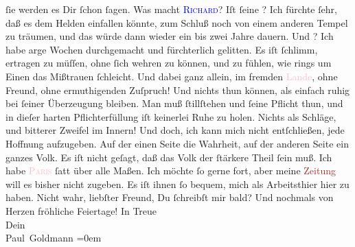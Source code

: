                ſie werden es Dir ſchon ſagen.\pend
           \pstart
           Was macht \textsc{\textcolor{blue}{Richard}{}\ledrightnote{\textcolor{blue}{Richard Beer-Hofmann}}}? Iſt ſeine \label{K_L02834-32v}\label{K_L02834-32h}? Ich fürchte ſehr, daß es dem Helden einfallen könnte,
               zum Schluß noch von einem anderen Tempel zu träumen, und das würde dann wieder ein
               bis zwei Jahre dauern. Und \label{K_L02834-8v}\label{K_L02834-8h}?{\dotsfour}\pend
           \pstart
           Ich habe arge Wochen durchgemacht und fürchterlich gelitten. Es iſt ſchlimm, \label{K_L02834-9v}\label{K_L02834-9h} ertragen zu müſſen, {\pb}ohne ſich wehren zu
               können, und zu fühlen, wie rings um Einen das Mißtrauen ſchleicht. Und dabei ganz
               allein, im fremden \textcolor{pink}{Lande}{}, ohne Freund, ohne
               ermuthigenden Zuſpruch! Und nichts thun können, als einfach ruhig bei ſeiner
               Überzeugung bleiben. Man muß  ſtillſtehen und ſeine Pflicht thun, und in dieſer
               harten Pflichterfüllung iſt keinerlei Ruhe\strikeout{\textcolor{gray}{r}} zu holen. Nichts als Schläge, und bitterer Zweifel im Innern! Und doch, ich
               kann mich nicht entſchließen, jede Hoffnung aufzugeben. Auf der einen Seite die
               Wahrheit, auf der anderen Seite ein ganzes Volk. Es iſt nicht geſagt, {\pb}daß das Volk der ſtärkere Theil ſein
               muß.\pend
           \pstart
           Ich habe \textsc{\textcolor{pink}{Paris}{}\ledrightnote{\textcolor{pink}{Paris}}} ſatt über alle Maßen. Ich möchte ſo gerne fort, aber meine \textcolor{brown}{Zeitung}{} will \strikeout{\textcolor{gray}{m}} es bisher nicht zugeben. Es iſt ihnen ſo bequem, mich als \strikeout{\textcolor{gray}{Ar}} Arbeitsthier hier zu haben.\pend
           \pstart
           Nicht wahr, liebſter Freund, Du ſchreibſt mir bald?\pend
           \pstart
           Und nochmals von Herzen fröhliche Feiertage!\pend
           \pstart
           In Treue {\\[\baselineskip]}Dein {\\[\baselineskip]}\spacefill\mbox{Paul Goldmann}\pend
           \leftskip=0em{}\endnumbering{}  
      